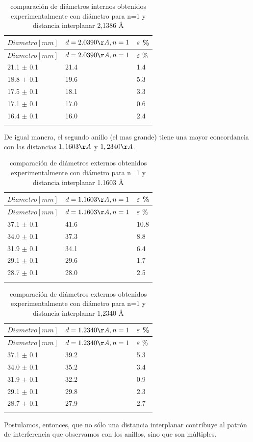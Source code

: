 \documentclass[]{article}
\begin{document}
\begin{longtable}[]{@{}lll@{}}
\toprule
\(Diametro[mm]\) & \(d=2.0390 \AA, n=1\) & \(\varepsilon\)
\%\tabularnewline
\midrule
\endfirsthead
\toprule
\(Diametro[mm]\) & \(d=2.0390 \AA, n=1\) & \(\varepsilon\)
\%\tabularnewline
\midrule
\endhead
21.1 \(\pm\) 0.1 & 21.4 & 1.4\tabularnewline
18.8 \(\pm\) 0.1 & 19.6 & 5.3\tabularnewline
17.5 \(\pm\) 0.1 & 18.1 & 3.3\tabularnewline
17.1 \(\pm\) 0.1 & 17.0 & 0.6\tabularnewline
16.4 \(\pm\) 0.1 & 16.0 & 2.4\tabularnewline
\bottomrule
\caption{comparación de diámetros internos obtenidos experimentalmente
con diámetro para n=1 y distancia interplanar 2,1386 Å}\tabularnewline
\end{longtable}

De igual manera, el segundo anillo (el mas grande) tiene una mayor concordancia con
las distancias \(1,1603 \AA\) y \(1,2340 \AA\).

\begin{longtable}[]{@{}lll@{}}
\toprule
\(Diametro[mm]\) & \(d=1.1603 \AA, n=1\) & \(\varepsilon\)
\%\tabularnewline
\midrule
\endfirsthead
\toprule
\(Diametro[mm]\) & \(d=1.1603 \AA, n=1\) & \(\varepsilon\)
\%\tabularnewline
\midrule
\endhead
37.1 \(\pm\) 0.1 & 41.6 & 10.8\tabularnewline
34.0 \(\pm\) 0.1 & 37.3 & 8.8\tabularnewline
31.9 \(\pm\) 0.1 & 34.1 & 6.4\tabularnewline
29.1 \(\pm\) 0.1 & 29.6 & 1.7\tabularnewline
28.7 \(\pm\) 0.1 & 28.0 & 2.5\tabularnewline
\bottomrule
\caption{comparación de diámetros externos obtenidos experimentalmente
con diámetro para n=1 y distancia interplanar 1.1603 \AA}\tabularnewline
\end{longtable}

\begin{longtable}[]{@{}lll@{}}
\toprule
\(Diametro[mm]\) & \(d=1.2340 \AA, n=1\) & \(\varepsilon\)
\%\tabularnewline
\midrule
\endfirsthead
\toprule
\(Diametro[mm]\) & \(d=1.2340 \AA, n=1\) & \(\varepsilon\)
\%\tabularnewline
\midrule
\endhead
37.1 \(\pm\) 0.1 & 39.2 & 5.3\tabularnewline
34.0 \(\pm\) 0.1 & 35.2 & 3.4\tabularnewline
31.9 \(\pm\) 0.1 & 32.2 & 0.9\tabularnewline
29.1 \(\pm\) 0.1 & 29.8 & 2.3\tabularnewline
28.7 \(\pm\) 0.1 & 27.9 & 2.7\tabularnewline
\bottomrule
\caption{comparación de diámetros externos obtenidos experimentalmente
con diámetro para n=1 y distancia interplanar 1,2340 \AA}\tabularnewline
\end{longtable}


Postulamos, entonces, que no sólo una distancia interplanar contribuye
al patrón de interferencia que observamos con los anillos, sino que son
múltiples.
\end{document}
